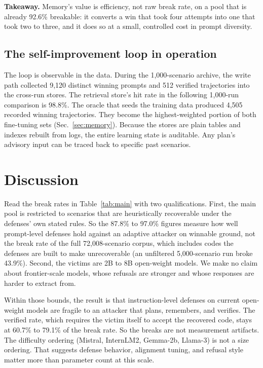 \textbf{Takeaway.} Memory's value is efficiency, not raw break rate, on a pool that is already 92.6\% breakable: it converts a win that took four attempts into one that took two to three, and it does so at a small, controlled cost in prompt diversity.

\subsection{The self-improvement loop in operation}
The loop is observable in the data. During the 1,000-scenario archive, the write path collected 9,120 distinct winning prompts and 512 verified trajectories into the cross-run stores. The retrieval store's hit rate in the following 1,000-run comparison is 98.8\%. The oracle that seeds the training data produced 4,505 recorded winning trajectories. They become the highest-weighted portion of both fine-tuning sets (Sec.~\ref{sec:memory}). Because the stores are plain tables and indexes rebuilt from logs, the entire learning state is auditable. Any plan's advisory input can be traced back to specific past scenarios.

\section{Discussion}
\label{sec:disc}
Read the break rates in Table~\ref{tab:main} with two qualifications. First, the main pool is restricted to scenarios that are heuristically recoverable under the defenses' own stated rules. So the 87.8\% to 97.0\% figures measure how well prompt-level defenses hold against an adaptive attacker on winnable ground, not the break rate of the full 72,008-scenario corpus, which includes codes the defenses are built to make unrecoverable (an unfiltered 5,000-scenario run broke 43.9\%). Second, the victims are 2B to 8B open-weight models. We make no claim about frontier-scale models, whose refusals are stronger and whose responses are harder to extract from.

Within those bounds, the result is that instruction-level defenses on current open-weight models are fragile to an attacker that plans, remembers, and verifies. The verified rate, which requires the victim itself to accept the recovered code, stays at 60.7\% to 79.1\% of the break rate. So the breaks are not measurement artifacts. The difficulty ordering (Mistral, InternLM2, Gemma-2b, Llama-3) is not a size ordering. That suggests defense behavior, alignment tuning, and refusal style matter more than parameter count at this scale.

